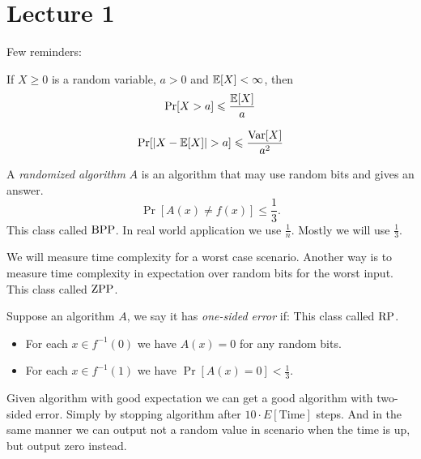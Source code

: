 
\section{Lecture 1}\label{sec:1} %

Few reminders:

\begin{theorem}
    \label{thm:markov}
    If $X \geq 0$ is a random variable, $a > 0$ and $\mathbb{E}[X] < \infty$, then
    \[
        \Pr[X > a] \leqslant \frac{\mathbb{E}[X]} {a}
    \]
\end{theorem}

\begin{theorem}
    \label{thm:chebyshev}
    \[
        \Pr[|X - \mathbb{E}[X]| > a] \leqslant \frac{\operatorname{Var}[X]} {a^2}
    \]
\end{theorem}

\begin{definition}
    A \emph{randomized algorithm} $A$ is an algorithm that may use random bits and gives an answer.
    \[
        \Pr[A(x) \neq f(x)] \leq \frac 1 3.
    \]
    This class called $\operatorname{BPP}$.
    In real world application we use $\frac 1 n$.
    Mostly we will use $\frac 1 3$.

    We will measure time complexity for a worst case scenario.
    Another way is to measure time complexity in expectation over random bits for the worst input.
    This class called $\operatorname{ZPP}$.
\end{definition}

\begin{definition}
    Suppose an algorithm $A$, we say it has \emph{one-sided error} if:
    This class called $\operatorname{RP}$.
    \begin{itemize}
        \item For each $x \in f^{-1}(0)$ we have $A(x) = 0$ for any random bits.
        \item For each $x \in f^{-1}(1)$ we have $\Pr[A(x) = 0] < \frac 1 3$.
    \end{itemize}
\end{definition}

\begin{statement}
    Given algorithm with good expectation we can get a good algorithm with two-sided error.
    Simply by stopping algorithm after $10 \cdot E[\text{Time}]$ steps.
    And in the same manner we can output not a random value in scenario when the time is up, but output zero instead.
\end{statement}

